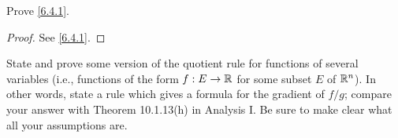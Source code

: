\begin{ex}\label{ex:6.4.3}
  Prove \cref{6.4.1}.
\end{ex}

\begin{proof}
  See \cref{6.4.1}.
\end{proof}

\begin{ex}\label{ex:6.4.4}
  State and prove some version of the quotient rule for functions of several variables (i.e., functions of the form \(f : E \to \mathbb{R}\) for some subset \(E\) of \(\mathbb{R}^n\)).
  In other words, state a rule which gives a formula for the gradient of \(f / g\);
  compare your answer with Theorem 10.1.13(h) in Analysis I.
  Be sure to make clear what all your assumptions are.
\end{ex}

